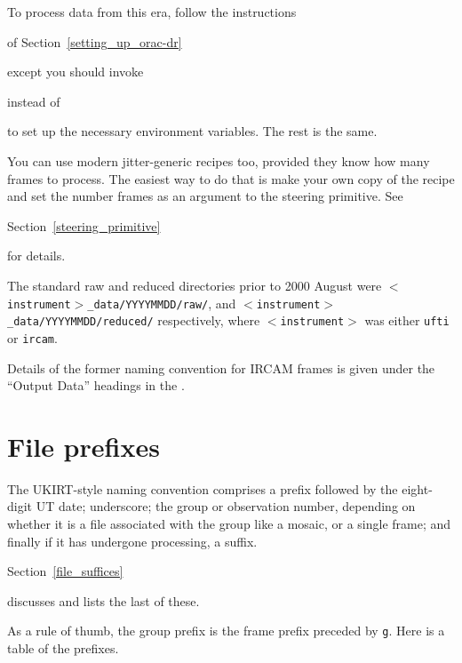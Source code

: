\documentclass[twoside,11pt,nolof]{starlink}
\begin{document}
To process data from this era, follow the instructions


\begin{latexonly}
of Section~\ref{setting_up_orac-dr}
\end{latexonly}
except you should invoke
\begin{terminalv}
\end{terminalv}
instead of
\begin{terminalv}
\end{terminalv}
to set up the necessary environment variables.  The rest is the same.

You can use modern jitter-generic recipes too, provided they know how
many frames to process.  The easiest way to do that is make your own
copy of the recipe and set the number frames as an argument to the
steering primitive.  See


\begin{latexonly}
Section~\ref{steering_primitive}
\end{latexonly}
for details.

The standard raw and reduced directories prior to 2000 August were
\linebreak \texttt{$<$instrument$>$\_data/YYYYMMDD/raw/}, and \texttt{$<$instrument$>$\_data/YYYYMMDD/reduced/} respectively, where
{\tt$<$instrument$>$} was either \texttt{ufti} or \texttt{ircam}.

Details of the former naming convention for IRCAM frames is given under
the ``Output Data'' headings in the .

\newpage
\section{File prefixes}\label{file_prefixes}%

The UKIRT-style naming convention comprises a prefix followed by the
eight-digit UT date; underscore; the group or observation number, depending on
whether it is a file associated with the group like a mosaic,
or a single frame; and finally if it has undergone processing, a suffix.


\begin{latexonly}
Section~\ref{file_suffices}
\end{latexonly}
discusses and lists the last of these.

As a rule of thumb, the group prefix is the frame prefix preceded by {\tt{g}}.
Here is a table of the prefixes.
\medskip
\end{document}
